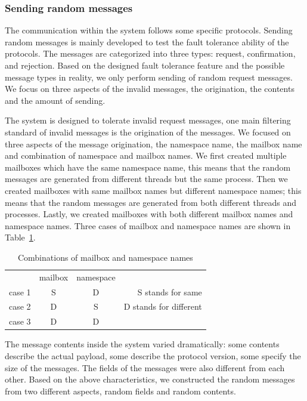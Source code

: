 \subsubsection{Sending random messages}
The communication within the system follows some specific protocols.  Sending random messages is mainly developed to test the fault tolerance ability of the protocols. The messages are categorized into three types: request, confirmation, and rejection.  Based on the designed fault tolerance feature and the possible message types in reality, we only perform sending of random request messages. We focus on three aspects of the invalid messages, the origination, the contents and the amount of sending.

The system is designed to tolerate invalid request messages, one main filtering standard of invalid messages is the origination of the messages. We focused on three aspects of the message origination, the namespace name, the mailbox name and combination of namespace and mailbox names. We first created multiple mailboxes which have the same namespace name, this means that the random messages are generated from different threads but the same process. Then we created mailboxes with same mailbox names but different namespace names; this means that the random messages are generated from both different threads and processes. Lastly, we created mailboxes with both different mailbox names and namespace names. Three cases of mailbox and namespace names are shown in Table~\ref{table:4.1}.

\begin{table}[ht!]
\centering
\begin{tabular}{| c | c | c |r}
 \cline{1-3}
       & mailbox & namespace \\ 
 \cline{1-3}
 case 1 & S & D & \hspace{1.3cm} S stands for same\\ 
 \cline{1-3}
 case 2 & D & S & D stands for different\\ 
 \cline{1-3}
 case 3 & D & D & \\ 
 \cline{1-3}
\end{tabular}
\caption{Combinations of mailbox and namespace names} %
\label{table:4.1}
\end{table}

The message contents inside the system varied dramatically: some contents describe the actual payload, some describe the protocol version, some specify the size of the messages. The fields of the messages were also different from each other. Based on the above characteristics, we constructed the random messages from two different aspects, random fields and random contents. 

